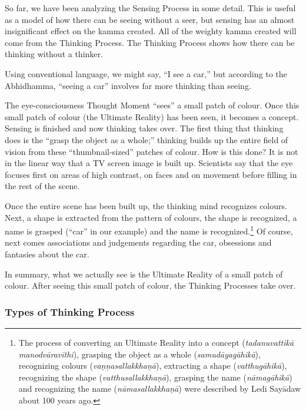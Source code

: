 So far, we have been analyzing the Sensing Process in some detail. This is useful as a model of how there can be seeing without a seer, but sensing has an almost insignificant effect on the kamma created. All of the weighty kamma created will come from the Thinking Process. The Thinking Process shows how there can be thinking without a thinker.

Using conventional language, we might say, “I see a car,” but according to the Abhidhamma, “seeing a car” involves far more thinking than seeing.

The eye-consciousness Thought Moment “sees” a small patch of colour. Once this small patch of colour (the Ultimate Reality) has been seen, it becomes a concept. Sensing is finished and now thinking takes over. The first thing that thinking does is the “grasp the object as a whole;” thinking builds up the entire field of vision from these “thumbnail-sized” patches of colour. How is this done? It is not in the linear way that a TV screen image is built up. Scientists say that the eye focuses first on areas of high contrast, on faces and on movement before filling in the rest of the scene.

Once the entire scene has been built up, the thinking mind recognizes colours. Next, a shape is extracted from the pattern of colours, the shape is recognized, a name is grasped (“car” in our example) and the name is recognized.\footnote{The process of converting an Ultimate Reality into a concept (\textit{tadanuvattikā manodvāravīthi}), grasping the object as a whole (\textit{samudāyagāhikā}), recognizing colours (\textit{vaṇṇasallakkhaṇā}), extracting a shape (\textit{vatthugāhikā}), recognizing the shape (\textit{vatthusallakkhaṇā}), grasping the name (\textit{nāmagāhikā}) and recognizing the name (\textit{nāmasallakkhaṇā}) were described by Ledi Sayādaw about 100 years ago.} Of course, next comes associations and judgements regarding the car, obsessions and fantasies about the car.

In summary, what we actually see is the Ultimate Reality of a small patch of colour. After seeing this small patch of colour, the Thinking Processes take over.

\subsubsection*{Types of Thinking Process}

